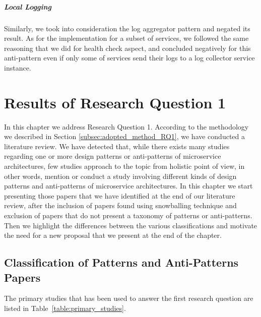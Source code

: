 \documentclass{Configuration_Files/PoliMi3i_thesis}
\begin{document}
\paragraph{Local Logging} Similarly, we took into consideration the log aggregator pattern and negated its result.
As for the implementation for a subset of services, we followed the same reasoning that we did for health check aspect,
and concluded negatively for this anti-pattern even if only some of services send their logs to a log collector service instance.

\chapter{Results of Research Question 1}
\label{ch:classification_result}%

In this chapter we address Research Question 1. According to the methodology we described in Section \ref{subsec:adopted_method_RQ1}, we have conducted a literature review. We have detected that, while there exists many studies regarding one or more design patterns or anti-patterns of microservice architectures, few studies approach to the topic from holistic point of view, in other words, mention or conduct a study involving different kinds of design patterns and anti-patterns of microservice architectures. In this chapter we start presenting those papers that we have identified at the end of our literature review, after the inclusion of papers found using snowballing technique and exclusion of papers that do not present a taxonomy of patterns or anti-patterns. Then we highlight the differences between the various classifications and motivate the need for a new proposal that we present at the end of the chapter.

\section{Classification of Patterns and Anti-Patterns Papers}
\label{sec:class_papers}

The primary studies that has been used to answer the first research question are listed in Table~\ref{table:primary_studies}.
\end{document}
